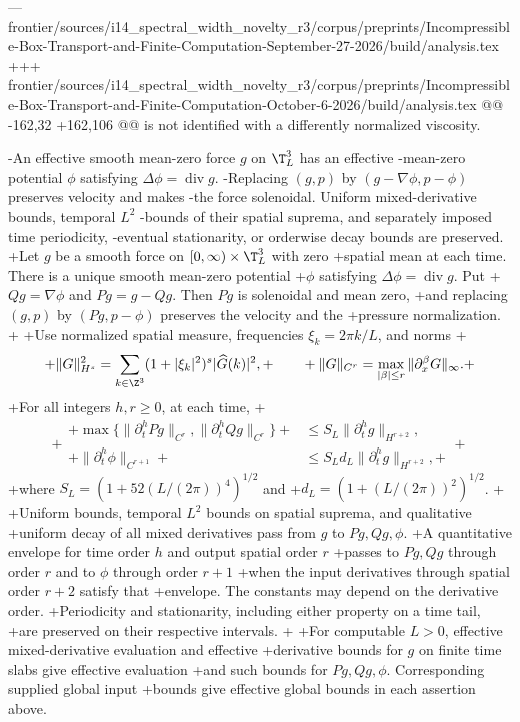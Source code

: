 --- frontier/sources/i14_spectral_width_novelty_r3/corpus/preprints/Incompressible-Box-Transport-and-Finite-Computation-September-27-2026/build/analysis.tex
+++ frontier/sources/i14_spectral_width_novelty_r3/corpus/preprints/Incompressible-Box-Transport-and-Finite-Computation-October-6-2026/build/analysis.tex
@@ -162,32 +162,106 @@
 is not identified with a differently normalized viscosity.
 
 \begin{proposition}\label{prop:projection-l2}
-An effective smooth mean-zero force $g$ on $\T_L^3$ has an effective
-mean-zero potential $\phi$ satisfying $\Delta\phi=\operatorname{div}g$.
-Replacing $(g,p)$ by $(g-\nabla\phi,p-\phi)$ preserves velocity and makes
-the force solenoidal. Uniform mixed-derivative bounds, temporal $L^2$
-bounds of their spatial suprema, and separately imposed time periodicity,
-eventual stationarity, or orderwise decay bounds are preserved.
+Let $g$ be a smooth force on $[0,\infty)\times\T_L^3$ with zero
+spatial mean at each time. There is a unique smooth mean-zero potential
+$\phi$ satisfying $\Delta\phi=\operatorname{div}g$. Put
+$Qg=\nabla\phi$ and $Pg=g-Qg$. Then $Pg$ is solenoidal and mean zero,
+and replacing $(g,p)$ by $(Pg,p-\phi)$ preserves the velocity and the
+pressure normalization.
+
+Use normalized spatial measure, frequencies $\xi_k=2\pi k/L$, and norms
+\[
+ \|G\|_{H^s}^2=\sum_{k\in\Z^3}(1+|\xi_k|^2)^s|\widehat G(k)|^2,
+ \qquad
+ \|G\|_{C^r}=\max_{|\beta|\le r}\|\partial_x^\beta G\|_\infty.
+\]
+For all integers $h,r\ge0$, at each time,
+\begin{equation}\label{eq:projection-estimate}
+ \begin{aligned}
+ \max\{\|\partial_t^h Pg\|_{C^r},\|\partial_t^h Qg\|_{C^r}\}
+     &\le S_L\|\partial_t^h g\|_{H^{r+2}},\\
+ \|\partial_t^h\phi\|_{C^{r+1}}
+     &\le S_Ld_L\|\partial_t^h g\|_{H^{r+2}},
+ \end{aligned}
+\end{equation}
+where $S_L=(1+52(L/(2\pi))^4)^{1/2}$ and
+$d_L=(1+(L/(2\pi))^2)^{1/2}$.
+
+Uniform bounds, temporal $L^2$ bounds on spatial suprema, and qualitative
+uniform decay of all mixed derivatives pass from $g$ to $Pg,Qg,\phi$.
+A quantitative envelope for time order $h$ and output spatial order $r$
+passes to $Pg,Qg$ through order $r$ and to $\phi$ through order $r+1$
+when the input derivatives through spatial order $r+2$ satisfy that
+envelope. The constants may depend on the derivative order.
+Periodicity and stationarity, including either property on a time tail,
+are preserved on their respective intervals.
+
+For computable $L>0$, effective mixed-derivative evaluation and effective
+derivative bounds for $g$ on finite time slabs give effective evaluation
+and such bounds for $Pg,Qg,\phi$. Corresponding supplied global input
+bounds give effective global bounds in each assertion above.
 \end{proposition}
